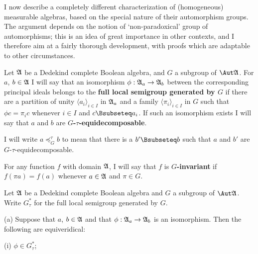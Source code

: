\def\Gte{$G$-\vthsp$\tau$-\vthsp equidecomposable}
\def\IMPLY#1#2{{\bf (#1)$\Rightarrow$(#2)}}
\def\ptG{\preccurlyeq^{\tau}_G}

\def\chaptername{Measurable algebras}
\def\sectionname{Kawada's theorem}


I now describe a completely different characterization
of (homogeneous) measurable algebras, based on the special nature of
their automorphism groups.   The argument depends on the notion of
`non-paradoxical' group of automorphisms;  this is an idea of great
importance in other contexts, and I therefore aim at a fairly thorough
development, with proofs which are adaptable to other circumstances.

 Let $\frak A$ be a Dedekind complete Boolean
algebra, and $G$ a subgroup of $\Aut\frak A$.
For $a$, $b\in\frak A$ I will say that an isomorphism
$\phi:\frak A_a\to\frak A_b$ between the corresponding principal ideals
belongs to
the {\bf full local semigroup generated by $G$} if there are a partition
of unity $\langle a_i\rangle_{i\in I}$ in $\frak A_a$ and a family
$\langle \pi_i\rangle_{i\in I}$ in $G$ such that $\phi c=\pi_ic$
whenever $i\in I$ and $c\Bsubseteq a_i$.   If such an isomorphism exists
I will say that $a$ and $b$ are {\bf $G$-$\tau$-equidecomposable}.

I will write $a\ptG b$ to mean that there is a $b'\Bsubseteq b$ such
that $a$ and $b'$ are \Gte.

For any function $f$ with domain $\frak A$, I will say that $f$ is {\bf
$G$-invariant} if $f(\pi a)=f(a)$ whenever $a\in\frak A$ and $\pi\in G$.

 Let $\frak A$ be a Dedekind complete Boolean
algebra and $G$ a subgroup of $\Aut\frak A$.   Write $G^*_{\tau}$ for
the full local semigroup generated by $G$.

(a) Suppose that $a$, $b\in\frak A$ and that
$\phi:\frak A_a\to\frak A_b$ is an isomorphism.   Then the following are
equiveridical:

\quad (i) $\phi\in G^*_{\tau}$;

